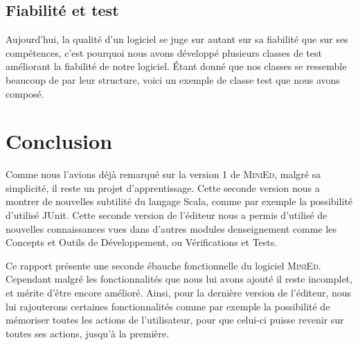 \documentclass[a4paper, 12pt]{report}
\begin{document}
		\section*{Fiabilité et test}

		Aujourd'hui, la qualité d'un logiciel se juge sur autant sur sa fiabilité que sur ses compétences, c'est pourquoi nous avons développé plusieurs classes de test améliorant la fiabilité de notre logiciel. \'Etant donné que nos classes se ressemble beaucoup de par leur structure, voici un exemple de classe test que nous avons composé.

		\vspace{0.5cm}

		

	\newpage
	
	\chapter*{Conclusion}
	
		Comme nous l'avions déjà remarqué sur la version 1 de \textsc{MiniEd}, malgré sa simplicité, il reste un projet d'apprentissage. Cette seconde version nous a montrer de nouvelles subtilité du langage Scala, comme par exemple la possibilité d'utilisé JUnit. Cette seconde version de l'éditeur nous a permis d'utilisé de nouvelles connaissances vues dans d'autres modules denseignement comme les Concepts et Outils de Développement, ou Vérifications et Tests.

		\vspace{0.5cm}

	Ce rapport présente une seconde ébauche fonctionnelle du logiciel \textsc{MiniEd}. Cependant malgré les fonctionnalités que nous lui avons ajouté il reste incomplet, et mérite d'être encore amélioré. Ainsi, pour la dernière version de l'éditeur, nous lui rajouterons certaines fonctionnalités comme par exemple la possibilité de mémoriser toutes les actions de l'utilisateur, pour que celui-ci puisse revenir sur toutes ses actions, jusqu'à la première.
\end{document}
